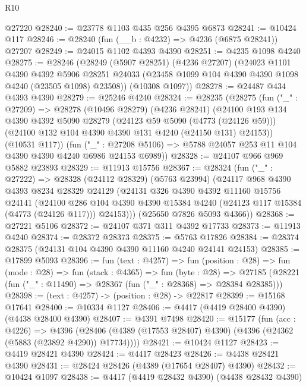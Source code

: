 \begin{lexlean}{R10}
\begin{coremodule}
    @27220
@28240 := @23778 @1103 @435 @256 @4395 @6873
@28241 := @10424 @117
@28246 := @28240 (fun (__b : @4232) => @4236 (@6875 @28241)) @27207
@28249 := @24015 @1102 @4393 @4390
@28251 := @4235 @1098 @4240
@28275 := @28246
    (@28249
      (@5907 @28251)
      (@4236 @27207)
      (@24023
        @1101
        @4390
        @4392
        @5906
        @28251
        @24033
        (@23458 @1099 @104 @4390 @4390 @1098 @4240 (@23505 @1098) @23508))
      (@10308 @1097))
@28278 := @24487 @434 @4393 @4390
@28279 := @25246 @4240
@28324 := @28235
    (@28275
      (fun ("_" : @27209) =>
      @28278
        (@10496 @28279)
        (@4236 @28241)
        (@24100
          @193
          @134
          @4390
          @4392
          @5090
          @28279
          (@24123 @59 @5090 (@4773 (@24126 @59)))
          (@24100 @132 @104 @4390 @4390 @131 @4240 (@24150 @131) @24153))
        (@10531 @117))
      (fun ("_" : @27208 @5106) => @5788 @24057 @253 @11 @104 @4390 @4390 @4240 @6986 @24153 @6989))
@28328 := @24107 @966 @969 @5882 @23893
@28329 := @11913 @15756
@28367 := @28324
    (fun ("_" : @27222) =>
    @28328
      (@24112 @28329)
      (@5763 @23994)
      (@24117
        @968
        @4390
        @4393
        @8234
        @28329
        @24129
        (@24131
          @326
          @4390
          @4392
          @11160
          @15756
          @24141
          (@24100
            @286
            @104
            @4390
            @4390
            @15384
            @4240
            (@24123 @117 @15384 (@4773 (@24126 @117)))
            @24153)))
      (@25650 @7826 @5093 @4366))
@28368 := @27221 @5106
@28372 := @24107 @371 @311 @4392 @17733
@28373 := @11913 @4240
@28374 := @28372 @28373
@28375 := @5763 @17826
@28384 := @28374 @28375 (@24131 @104 @4390 @4390 @11160 @4240 @24141 @24153)
@28385 := @17899 @5093
@28396 := fun (text : @4257) =>
  fun (position : @28) =>
  fun (mode : @28) =>
  fun (stack : @4365) =>
  fun (byte : @28) =>
  @27185 (@28221 (fun ("_" : @11490) => @28367 (fun ("_" : @28368) => @28384 @28385)))
@28398 := (text : @4257) -> (position : @28) -> @22817
@28399 := @15168 @17641
@28400 := @10334 @1127
@28406 := @4417 (@4419 @28400 @4390) (@4438 @28400 @4390)
@28407 := @4391 @7498
@28420 := @15177
    (fun (acc : @4226) =>
    @4396 (@28406 (@4389 (@17553 @28407) @4390) (@4396 (@24362 (@5883 (@23892 @4290)) @17734))))
@28421 := @10424 @1127
@28423 := @4419 @28421 @4390
@28424 := @4417 @28423
@28426 := @4438 @28421 @4390
@28431 := @28424 @28426 (@4389 (@17654 @28407) @4390)
@28432 := @10424 @1097
@28438 := @4417 (@4419 @28432 @4390) (@4438 @28432 @4390)

\end{coremodule}
\end{lexlean}
